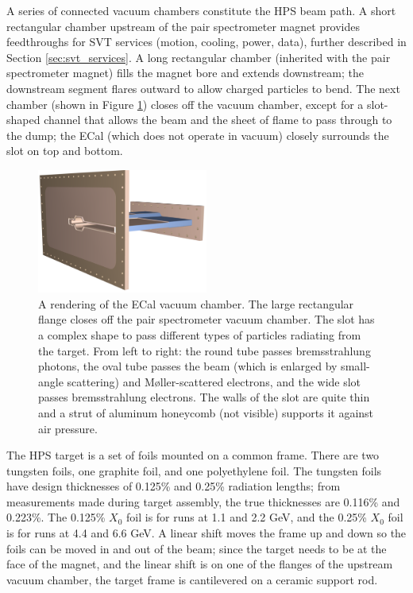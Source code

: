 A series of connected vacuum chambers constitute the HPS beam path.
A short rectangular chamber upstream of the pair spectrometer magnet provides feedthroughs for SVT services (motion, cooling, power, data), further described in Section \ref{sec:svt_services}.
A long rectangular chamber (inherited with the pair spectrometer magnet) fills the magnet bore and extends downstream; the downstream segment flares outward to allow charged particles to bend.
The next chamber (shown in Figure \ref{fig:ecal_chamber}) closes off the vacuum chamber, except for a slot-shaped channel that allows the beam and the sheet of flame to pass through to the dump; the ECal (which does not operate in vacuum) closely surrounds the slot on top and bottom.

\begin{figure}[htp]
    \begin{center}
        \includegraphics[width=0.5\textwidth]{detector/figs/ecal_vac}
    \end{center}
    \caption{A rendering of the ECal vacuum chamber.
    The large rectangular flange closes off the pair spectrometer vacuum chamber.
    The slot has a complex shape to pass different types of particles radiating from the target.
    From left to right: the round tube passes bremsstrahlung photons, the oval tube passes the beam (which is enlarged by small-angle scattering) and M{\o}ller-scattered electrons, and the wide slot passes bremsstrahlung electrons.
    The walls of the slot are quite thin and a strut of aluminum honeycomb (not visible) supports it against air pressure.
    }
    \label{fig:ecal_chamber}
\end{figure}

The HPS target is a set of foils mounted on a common frame.
There are two tungsten foils, one graphite foil, and one polyethylene foil.
The tungsten foils have design thicknesses of 0.125\% and 0.25\% radiation lengths; from measurements made during target assembly, the true thicknesses are 0.116\% and 0.223\%.
The 0.125\% $X_0$ foil is for runs at 1.1 and 2.2 GeV, and the 0.25\% $X_0$ foil is for runs at 4.4 and 6.6 GeV.
A linear shift moves the frame up and down so the foils can be moved in and out of the beam; since the target needs to be at the face of the magnet, and the linear shift is on one of the flanges of the upstream vacuum chamber, the target frame is cantilevered on a ceramic support rod.

